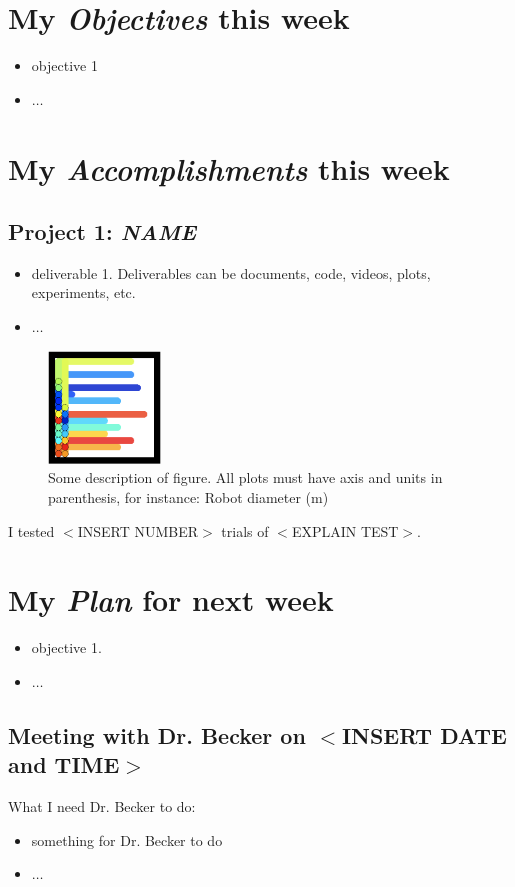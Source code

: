 \newcommand{\handoutName}{Weekly report}
\newcommand{\handoutdate}{September 28, 2014}
\newcommand{\duedate}{}


\section{My \emph{Objectives} this week}
\begin{itemize}
\item objective 1
\item $\ldots$
\end{itemize}


\section{My \emph{Accomplishments} this week}

\subsection{Project 1: \emph{NAME}}

\begin{itemize}
\item deliverable 1.  Deliverables can be documents, code, videos, plots, experiments, etc.
\item $\ldots$
\end{itemize}

\begin{figure}[h]
\begin{center}
\includegraphics[width=3cm]{fig/CovergeSimpleEnd.png}
\caption{Some description of figure.  All plots must have axis and units in parenthesis, for instance:  Robot diameter (m)}
\end{center}
\end{figure}
I tested $<$INSERT NUMBER$>$ trials of $<$EXPLAIN TEST$>$.

\section{My \emph{Plan} for next week}

\begin{itemize}
\item objective 1. 
\item $\ldots$
\end{itemize}

\subsection{Meeting with Dr. Becker on $<$INSERT DATE and TIME$>$}

What I need Dr. Becker to do:
\begin{itemize}
\item something for Dr. Becker to do
\item $\ldots$
\end{itemize}



